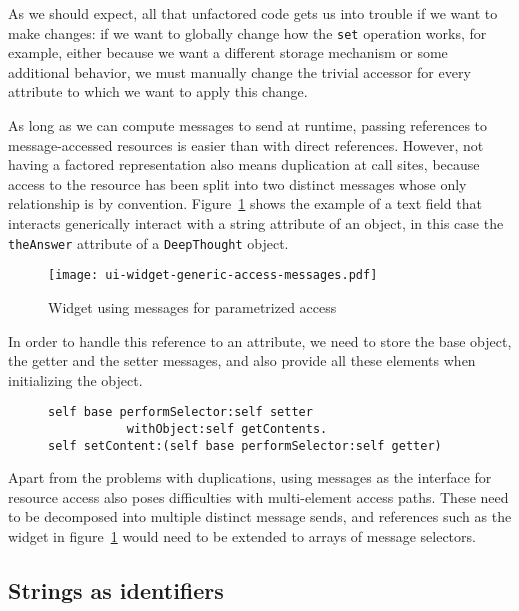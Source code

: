 \documentclass[preprint,authoryear]{llncs}
\begin{document}
As we should expect, all that unfactored code gets us into trouble if we want 
to make changes:   if we want to globally change how the {\tt set}
operation works, for example, either because we want a different storage
mechanism or some additional behavior,
we must manually change the trivial accessor for every attribute to which
we want to apply this change.


As long as we can compute messages to send at runtime,
passing references to message-accessed resources is easier than with
direct references.  However, not having a factored representation also means
duplication at call sites, because 
access to the resource has been split into two distinct messages whose only relationship is by 
convention.   Figure~\ref{ui-widget-msg-access} shows the example of a text field
that interacts generically interact with a string attribute of an object, in 
this case the {\tt theAnswer} attribute of a {\tt DeepThought} object.

\begin{figure}[htbp]
\begin{center}
\texttt{[image: ui-widget-generic-access-messages.pdf]}
\caption{Widget using messages for parametrized access}
\label{ui-widget-msg-access}
\end{center}
\end{figure}

In order to handle this reference to an attribute, we need to store the base object,
the getter and the setter messages, and also provide all these elements when
initializing the object.

\begin{figure}[htbp]
\begin{lstlisting}[style=numbers,label=parametrized-message-access,caption=Parametrized access via messages.]
self base performSelector:self setter 
	       withObject:self getContents.
self setContent:(self base performSelector:self getter)
\end{lstlisting}
\end{figure}

Apart from the problems with duplications, using messages as the interface for resource
access also poses difficulties with multi-element access paths.  These need to be decomposed
into multiple distinct message sends, and references such as the widget in figure~\ref{ui-widget-msg-access}
would need to be extended to arrays of message selectors.

\subsection{Strings as identifiers}
\end{document}
